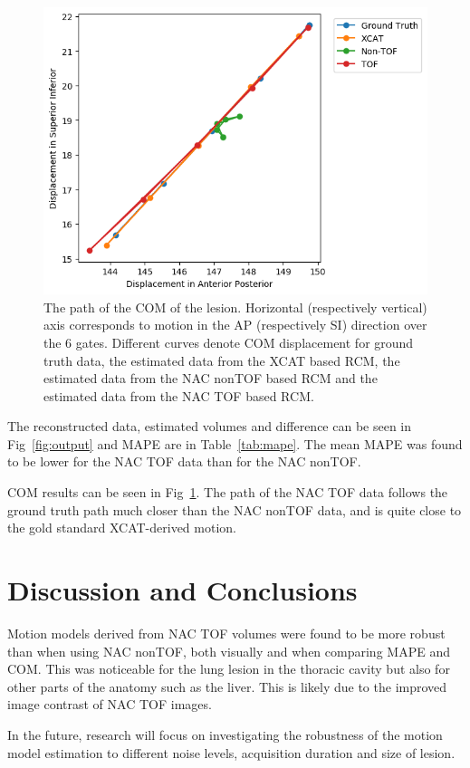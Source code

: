 \documentclass[10pt,twocolumn,twoside,letterpaper]{IEEEtran}
\begin{document}
\begin{figure}
    \centering
    \includegraphics[width=1.0\linewidth]{figures/TOF.png}
    \captionsetup{singlelinecheck=false, justification=centering}
    \caption{The path of the \gls{COM} of the lesion. Horizontal (respectively vertical) axis corresponds to motion in the \gls{AP} (respectively \gls{SI}) direction over the $6$ gates. Different curves denote \gls{COM} displacement for  ground truth data, the estimated data from the \gls{XCAT} based \gls{RCM}, the estimated data from the \gls{NAC} \gls{nonTOF} based \gls{RCM} and the estimated data from the \gls{NAC} \gls{TOF} based \gls{RCM}.}
    \label{fig:com_graph}
\end{figure}

 The reconstructed data, estimated volumes and difference can be seen in Fig~\ref{fig:output} and \gls{MAPE} are in Table~\ref{tab:mape}. The mean \gls{MAPE} was found to be lower for the \gls{NAC} \gls{TOF} data than for the \gls{NAC} \gls{nonTOF}.

 \gls{COM} results can be seen in Fig~\ref{fig:com_graph}. The path of the \gls{NAC} \gls{TOF} data follows the ground truth path much closer than the \gls{NAC} \gls{nonTOF} data, and is quite close to the gold standard \gls{XCAT}-derived motion.

\section{Discussion and Conclusions}
Motion models derived from \gls{NAC} \gls{TOF} volumes were found to be more robust than when using \gls{NAC} \gls{nonTOF}, both visually and when comparing \gls{MAPE} and \gls{COM}. This was noticeable for the lung lesion in the thoracic cavity but also for other parts of the anatomy such as the liver. This is likely due to the improved image contrast of \gls{NAC} \gls{TOF} images.

In the future, research will focus on investigating the robustness of the motion model estimation to different noise levels, acquisition duration and size of lesion.

\AtNextBibliography{\scriptsize}
\printbibliography
\end{document}
